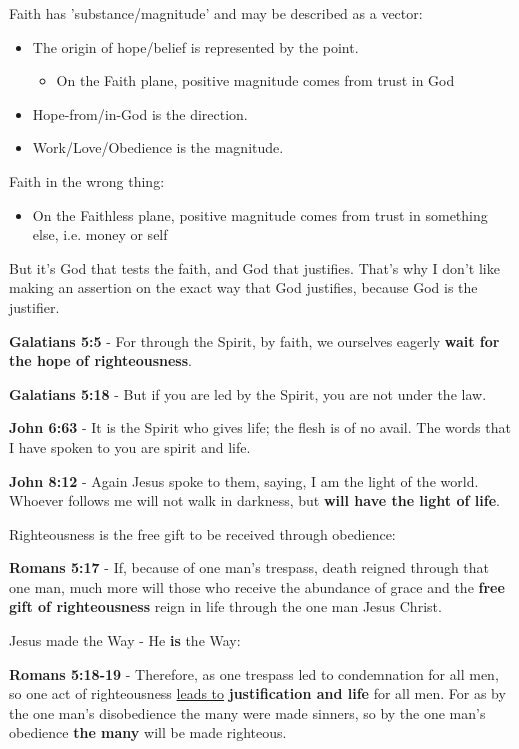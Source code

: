 \documentclass[11pt]{article}
\begin{document}
Faith has 'substance/magnitude' and may be described as a vector:
\begin{itemize}
\item The origin of hope/belief is represented by the point.
\begin{itemize}
\item On the Faith plane, positive magnitude comes from trust in God
\end{itemize}
\item Hope-from/in-God is the direction.
\item Work/Love/Obedience is the magnitude.
\end{itemize}

Faith in the wrong thing:
\begin{itemize}
\item On the Faithless plane, positive magnitude comes from trust in something else, i.e. money or self
\end{itemize}

But it's God that tests the faith, and God that justifies. That's why I don't like making an assertion on the exact way that God justifies, because God is the justifier.

\textbf{Galatians 5:5} - For through the Spirit, by faith, we ourselves eagerly \textbf{wait for the hope of righteousness}.

\textbf{Galatians 5:18} - But if you are led by the Spirit, you are not under the law.

\textbf{John 6:63} - It is the Spirit who gives life; the flesh is of no avail. The words that I have spoken to you are spirit and life.

\textbf{John 8:12} - Again Jesus spoke to them, saying, I am the light of the world. Whoever follows me will not walk in darkness, but \textbf{will have the light of life}.

Righteousness is the free gift to be received through obedience:

\textbf{Romans 5:17} - If, because of one man's trespass, death reigned through that one man, much more will those who receive the abundance of grace and the \textbf{free gift of righteousness} reign in life through the one man Jesus Christ.

Jesus made the Way - He \textbf{is} the Way:

\textbf{Romans 5:18-19} - Therefore, as one trespass led to condemnation for all men, so one act of righteousness \uline{leads to} \textbf{justification and life} for all men. For as by the one man's disobedience the many were made sinners, so by the one man's obedience \textbf{the many} will be made righteous.
\end{document}
